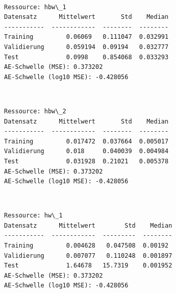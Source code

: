 \documentclass[11pt]{article}
\begin{document}
    \begin{center}
    \end{center}
    { \hspace*{\fill} \\}
    
    \begin{Verbatim}[commandchars=\\\{\}]
Ressource: hbw\_1
Datensatz      Mittelwert       Std    Median
-----------  ------------  --------  --------
Training         0.06069   0.111047  0.032991
Validierung      0.059194  0.09194   0.032777
Test             0.0998    0.854068  0.033293
AE-Schwelle (MSE): 0.373202
AE-Schwelle (log10 MSE): -0.428056

    \end{Verbatim}

    \begin{center}
    \end{center}
    { \hspace*{\fill} \\}
    
    \begin{Verbatim}[commandchars=\\\{\}]
Ressource: hbw\_2
Datensatz      Mittelwert       Std    Median
-----------  ------------  --------  --------
Training         0.017472  0.037664  0.005017
Validierung      0.018     0.040039  0.004984
Test             0.031928  0.21021   0.005378
AE-Schwelle (MSE): 0.373202
AE-Schwelle (log10 MSE): -0.428056

    \end{Verbatim}

    \begin{center}
    \end{center}
    { \hspace*{\fill} \\}
    
    \begin{Verbatim}[commandchars=\\\{\}]
Ressource: hw\_1
Datensatz      Mittelwert        Std    Median
-----------  ------------  ---------  --------
Training         0.004628   0.047508  0.00192
Validierung      0.007077   0.110248  0.001897
Test             1.64678   15.7319    0.001952
AE-Schwelle (MSE): 0.373202
AE-Schwelle (log10 MSE): -0.428056

    \end{Verbatim}
\end{document}
